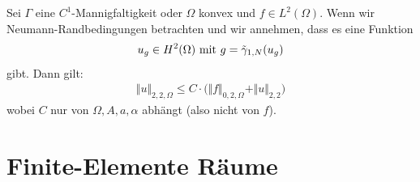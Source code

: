 \begin{theorem}[Regularität]\label{theorem3.3}\enter
	Sei $\Gamma$ eine $C^1$-Mannigfaltigkeit oder $\Omega$ konvex und $f\in L^2(\Omega)$. Wenn wir Neumann-Randbedingungen betrachten und wir annehmen, dass es eine Funktion 
\begin{align*}
u_g\in H^2(\Omega)\mit g=\tilde{\gamma}_{1,N}(u_g)
\end{align*}
gibt. Dann gilt:
\begin{align*}
\Vert u\Vert_{2,2,\Omega}\leq C\cdot\Big(\Vert f\Vert_{0,2,\Omega}+\Vert u\Vert_{2,2}\Big)
\end{align*}
wobei $C$ nur von $\Omega, A,a,\alpha$ abhängt (also nicht von $f$).
\end{theorem}

\section{Finite-Elemente Räume} %
